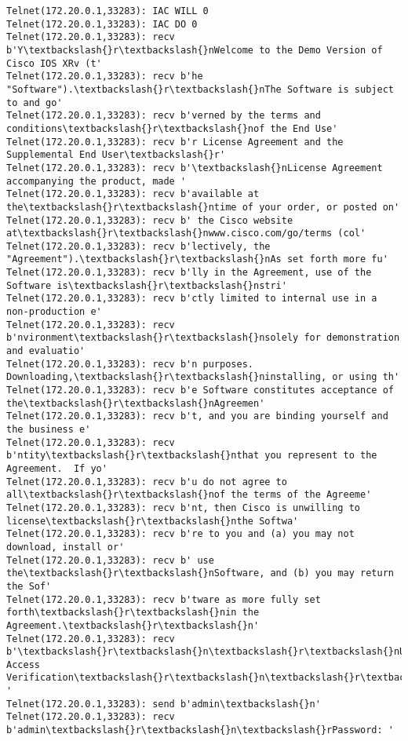 \documentclass[11pt]{article}
\begin{document}
\begin{Verbatim}[commandchars=\\\{\}]
Telnet(172.20.0.1,33283): IAC WILL 0
Telnet(172.20.0.1,33283): IAC DO 0
Telnet(172.20.0.1,33283): recv b'Y\textbackslash{}r\textbackslash{}nWelcome to the Demo Version of Cisco IOS XRv (t'
Telnet(172.20.0.1,33283): recv b'he "Software").\textbackslash{}r\textbackslash{}nThe Software is subject to and go'
Telnet(172.20.0.1,33283): recv b'verned by the terms and conditions\textbackslash{}r\textbackslash{}nof the End Use'
Telnet(172.20.0.1,33283): recv b'r License Agreement and the Supplemental End User\textbackslash{}r'
Telnet(172.20.0.1,33283): recv b'\textbackslash{}nLicense Agreement accompanying the product, made '
Telnet(172.20.0.1,33283): recv b'available at the\textbackslash{}r\textbackslash{}ntime of your order, or posted on'
Telnet(172.20.0.1,33283): recv b' the Cisco website at\textbackslash{}r\textbackslash{}nwww.cisco.com/go/terms (col'
Telnet(172.20.0.1,33283): recv b'lectively, the "Agreement").\textbackslash{}r\textbackslash{}nAs set forth more fu'
Telnet(172.20.0.1,33283): recv b'lly in the Agreement, use of the Software is\textbackslash{}r\textbackslash{}nstri'
Telnet(172.20.0.1,33283): recv b'ctly limited to internal use in a non-production e'
Telnet(172.20.0.1,33283): recv b'nvironment\textbackslash{}r\textbackslash{}nsolely for demonstration and evaluatio'
Telnet(172.20.0.1,33283): recv b'n purposes.  Downloading,\textbackslash{}r\textbackslash{}ninstalling, or using th'
Telnet(172.20.0.1,33283): recv b'e Software constitutes acceptance of the\textbackslash{}r\textbackslash{}nAgreemen'
Telnet(172.20.0.1,33283): recv b't, and you are binding yourself and the business e'
Telnet(172.20.0.1,33283): recv b'ntity\textbackslash{}r\textbackslash{}nthat you represent to the Agreement.  If yo'
Telnet(172.20.0.1,33283): recv b'u do not agree to all\textbackslash{}r\textbackslash{}nof the terms of the Agreeme'
Telnet(172.20.0.1,33283): recv b'nt, then Cisco is unwilling to license\textbackslash{}r\textbackslash{}nthe Softwa'
Telnet(172.20.0.1,33283): recv b're to you and (a) you may not download, install or'
Telnet(172.20.0.1,33283): recv b' use the\textbackslash{}r\textbackslash{}nSoftware, and (b) you may return the Sof'
Telnet(172.20.0.1,33283): recv b'tware as more fully set forth\textbackslash{}r\textbackslash{}nin the Agreement.\textbackslash{}r\textbackslash{}n'
Telnet(172.20.0.1,33283): recv b'\textbackslash{}r\textbackslash{}n\textbackslash{}r\textbackslash{}nUser Access Verification\textbackslash{}r\textbackslash{}n\textbackslash{}r\textbackslash{}nUsername: '
Telnet(172.20.0.1,33283): send b'admin\textbackslash{}n'
Telnet(172.20.0.1,33283): recv b'admin\textbackslash{}r\textbackslash{}n\textbackslash{}rPassword: '

\end{Verbatim}
\end{document}
